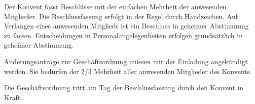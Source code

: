 \documentclass[a4paper, parskip=half, numbers=noenddot]{scrartcl}
\begin{document}
\begin{contract}
Der Konvent fasst Beschlüsse mit der einfachen Mehrheit der anwesenden Mitglieder. Die Beschlussfassung erfolgt in der Regel durch Handzeichen. Auf Verlangen eines anwesenden Mitglieds ist ein Beschluss in geheimer Abstimmung zu fassen. Entscheidungen in Personalangelegenheiten erfolgen grundsätzlich in geheimer Abstimmung.


Änderungsanträge zur Geschäftsordnung müssen mit der Einladung angekündigt werden. Sie bedürfen der 2/3 Mehrheit aller anwesenden Mitglieder des Konvents.

Die Geschäftsordnung tritt am Tag der Beschlussfassung durch den Konvent in Kraft.


\end{contract}
\end{document}
